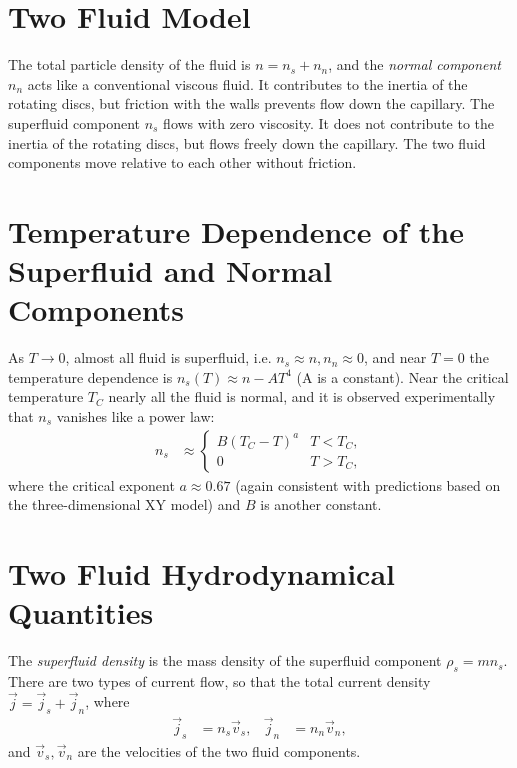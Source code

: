 \documentclass[qo.tex]{subfiles}
\begin{document}
\section{Two Fluid Model}
The total particle density of the fluid is $n=n_s+n_n$, and the \emph{normal component} $n_n$ acts like a conventional viscous fluid. 
It contributes to the inertia of the rotating discs, but friction with the walls prevents flow down the capillary. 
The superfluid component $n_s$ flows with zero viscosity. 
It does not contribute to the inertia of the rotating discs, but flows freely down the capillary.
The two fluid components move relative to each other without friction. 

\section{Temperature Dependence of the Superfluid and Normal Components}
As $T\to0$, almost all fluid is superfluid, i.e. $n_s\approx n,n_n\approx0$, and near $T=0$ the temperature dependence is $n_s(T)\approx n-AT^4$ (A is a constant).
Near the critical temperature $T_C$ nearly all the fluid is normal, and it is observed experimentally that $n_s$ vanishes like a power law:
\begin{align}
    n_s &\approx \begin{cases} B(T_C-T)^a & T<T_C, \\ 0 & T>T_C, \end{cases}
\end{align}
where the critical exponent $a\approx0.67$ (again consistent with predictions based on the three-dimensional XY model) and $B$ is another constant.

\section{Two Fluid Hydrodynamical Quantities}
The \emph{superfluid density} is the mass density of the superfluid component $\rho_s=mn_s$.
There are two types of current flow, so that the total current density $\vec{j}=\vec{j}_s+\vec{j}_n$, where
\begin{align}
    \vec{j}_s &= n_s\vec{v}_s, & \vec{j}_n &= n_n\vec{v}_n,
\end{align}
and $\vec{v}_s,\vec{v}_n$ are the velocities of the two fluid components.
\end{document}
